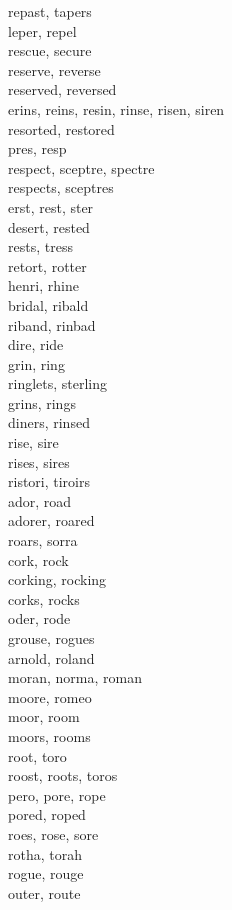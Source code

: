 repast, tapers\\
leper, repel\\
rescue, secure\\
reserve, reverse\\
reserved, reversed\\
erins, reins, resin, rinse, risen, siren\\
resorted, restored\\
pres, resp\\
respect, sceptre, spectre\\
respects, sceptres\\
erst, rest, ster\\
desert, rested\\
rests, tress\\
retort, rotter\\
henri, rhine\\
bridal, ribald\\
riband, rinbad\\
dire, ride\\
grin, ring\\
ringlets, sterling\\
grins, rings\\
diners, rinsed\\
rise, sire\\
rises, sires\\
ristori, tiroirs\\
ador, road\\
adorer, roared\\
roars, sorra\\
cork, rock\\
corking, rocking\\
corks, rocks\\
oder, rode\\
grouse, rogues\\
arnold, roland\\
moran, norma, roman\\
moore, romeo\\
moor, room\\
moors, rooms\\
root, toro\\
roost, roots, toros\\
pero, pore, rope\\
pored, roped\\
roes, rose, sore\\
rotha, torah\\
rogue, rouge\\
outer, route\\
